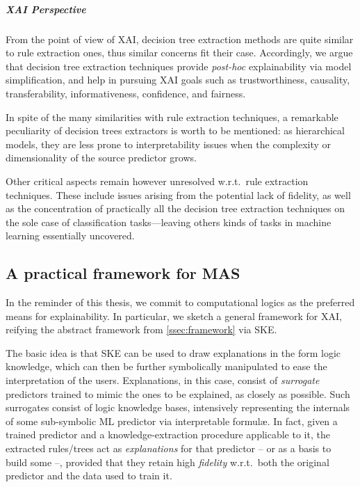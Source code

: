 \documentclass[12pt,a4paper,openright,twoside]{book}
\begin{document}
\subparagraph{XAI Perspective}

From the point of view of XAI, decision tree extraction methods are quite similar to rule extraction ones, thus similar concerns fit their case.
%
Accordingly, we argue that decision tree extraction techniques provide \emph{post-hoc} explainability via model simplification, and help in pursuing XAI goals such as trustworthiness, causality, transferability, informativeness, confidence, and fairness.

In spite of the many similarities with rule extraction techniques, a remarkable peculiarity of decision trees extractors is worth to be mentioned: as hierarchical models, they are less prone to interpretability issues when the complexity or dimensionality of the source predictor grows.

Other critical aspects remain however unresolved w.r.t.\ rule extraction techniques.
%
These include issues arising from the potential lack of fidelity, as well as the concentration of practically all the decision tree extraction techniques on the sole case of classification tasks---leaving others kinds of tasks in machine learning essentially uncovered.



\subsection{A practical framework for MAS}

In the reminder of this thesis, we commit to computational logics as the preferred means for explainability.
%
In particular, we sketch a general framework for XAI, reifying the abstract framework from \cref{ssec:framework} via SKE.

The basic idea is that SKE can be used to draw explanations in the form logic knowledge, which can then be further symbolically manipulated to ease the interpretation of the users.
%
Explanations, in this case, consist of \emph{surrogate} predictors trained to mimic the ones to be explained, as closely as possible.
%
Such surrogates consist of logic knowledge bases, intensively representing the internals of some sub-symbolic ML predictor via interpretable formul\ae{}.
%
In fact, given a trained predictor and a knowledge-extraction procedure applicable to it, the extracted rules/trees act as \emph{explanations} for that predictor -- or as a basis to build some --, provided that they retain high \emph{fidelity} w.r.t.\ both the original predictor and the data used to train it.
\end{document}

